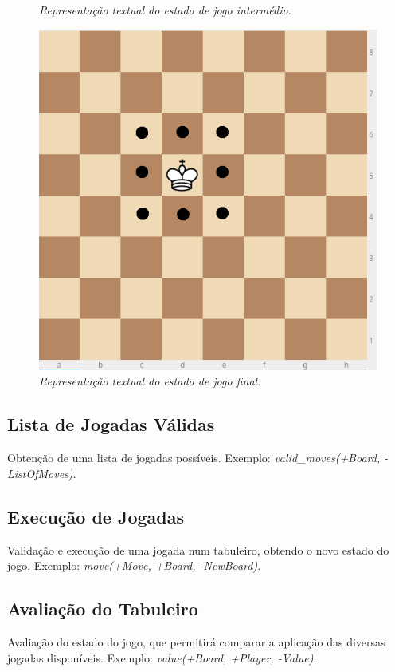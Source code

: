 \documentclass[a4paper]{article}
\begin{document}
\begin{tiny}
\begin{figure}[H]
\caption{\textit{Representação textual do estado de jogo intermédio.}}
\label{fig:fig6}
\endminipage\hfill
{}
\includegraphics[scale=0.2]{board1.png}
\caption{\textit{Representação textual do estado de jogo final.}}
\label{fig:fig7}
\endminipage
\end{figure}
\end{tiny}

\subsection{Lista de Jogadas Válidas} Obtenção de uma lista de jogadas possíveis. Exemplo: \textit{valid\_moves(+Board, -ListOfMoves)}.

\subsection{Execução de Jogadas} Validação e execução de uma jogada num tabuleiro, obtendo o novo estado do jogo. Exemplo: \textit{move(+Move, +Board, -NewBoard)}.

\subsection{Avaliação do Tabuleiro} Avaliação do estado do jogo, que permitirá comparar a aplicação das diversas jogadas disponíveis. Exemplo: \textit{value(+Board, +Player, -Value)}.
\end{document}
